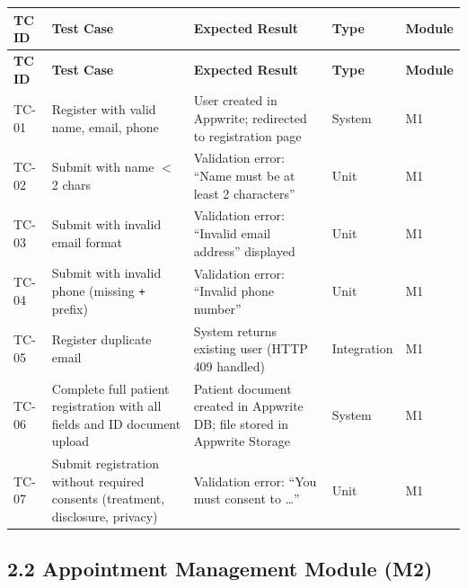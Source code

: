 \documentclass[12pt,a4paper]{article}
\begin{document}
\begin{longtable}{@{}p{1.2cm}p{3.5cm}p{4.5cm}p{2.5cm}p{1.5cm}@{}}
\toprule
\textbf{TC ID} & \textbf{Test Case} & \textbf{Expected Result} & \textbf{Type} & \textbf{Module} \\
\midrule
\endfirsthead
\toprule
\textbf{TC ID} & \textbf{Test Case} & \textbf{Expected Result} & \textbf{Type} & \textbf{Module} \\
\midrule
\endhead

TC-01 & Register with valid name, email, phone & User created in Appwrite; redirected to registration page & System & M1 \\
\midrule
TC-02 & Submit with name $<$ 2 chars & Validation error: ``Name must be at least 2 characters'' & Unit & M1 \\
\midrule
TC-03 & Submit with invalid email format & Validation error: ``Invalid email address'' displayed & Unit & M1 \\
\midrule
TC-04 & Submit with invalid phone (missing \texttt{+} prefix) & Validation error: ``Invalid phone number'' & Unit & M1 \\
\midrule
TC-05 & Register duplicate email & System returns existing user (HTTP 409 handled) & Integration & M1 \\
\midrule
TC-06 & Complete full patient registration with all fields and ID document upload & Patient document created in Appwrite DB; file stored in Appwrite Storage & System & M1 \\
\midrule
TC-07 & Submit registration without required consents (treatment, disclosure, privacy) & Validation error: ``You must consent to \ldots'' & Unit & M1 \\
\bottomrule
\end{longtable}

\subsection{2.2 Appointment Management Module (M2)}
\end{document}
